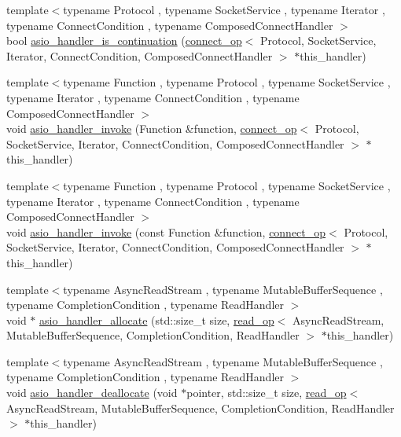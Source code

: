 \begin{DoxyCompactItemize}
\item 
{\footnotesize template$<$typename Protocol , typename Socket\+Service , typename Iterator , typename Connect\+Condition , typename Composed\+Connect\+Handler $>$ }\\bool \hyperlink{namespaceasio_1_1detail_aee7a6a910efdc4298668ed85823e585f}{asio\+\_\+handler\+\_\+is\+\_\+continuation} (\hyperlink{classasio_1_1detail_1_1connect__op}{connect\+\_\+op}$<$ Protocol, Socket\+Service, Iterator, Connect\+Condition, Composed\+Connect\+Handler $>$ $\ast$this\+\_\+handler)
\item 
{\footnotesize template$<$typename Function , typename Protocol , typename Socket\+Service , typename Iterator , typename Connect\+Condition , typename Composed\+Connect\+Handler $>$ }\\void \hyperlink{namespaceasio_1_1detail_a72d0a84b51adc466095a51a973f08fc8}{asio\+\_\+handler\+\_\+invoke} (Function \&function, \hyperlink{classasio_1_1detail_1_1connect__op}{connect\+\_\+op}$<$ Protocol, Socket\+Service, Iterator, Connect\+Condition, Composed\+Connect\+Handler $>$ $\ast$this\+\_\+handler)
\item 
{\footnotesize template$<$typename Function , typename Protocol , typename Socket\+Service , typename Iterator , typename Connect\+Condition , typename Composed\+Connect\+Handler $>$ }\\void \hyperlink{namespaceasio_1_1detail_a8b6277ab4da1389691602d086ff7b78c}{asio\+\_\+handler\+\_\+invoke} (const Function \&function, \hyperlink{classasio_1_1detail_1_1connect__op}{connect\+\_\+op}$<$ Protocol, Socket\+Service, Iterator, Connect\+Condition, Composed\+Connect\+Handler $>$ $\ast$this\+\_\+handler)
\item 
{\footnotesize template$<$typename Async\+Read\+Stream , typename Mutable\+Buffer\+Sequence , typename Completion\+Condition , typename Read\+Handler $>$ }\\void $\ast$ \hyperlink{namespaceasio_1_1detail_a3e0f238f3680cc2cbec076acffd9d6b2}{asio\+\_\+handler\+\_\+allocate} (std\+::size\+\_\+t size, \hyperlink{classasio_1_1detail_1_1read__op}{read\+\_\+op}$<$ Async\+Read\+Stream, Mutable\+Buffer\+Sequence, Completion\+Condition, Read\+Handler $>$ $\ast$this\+\_\+handler)
\item 
{\footnotesize template$<$typename Async\+Read\+Stream , typename Mutable\+Buffer\+Sequence , typename Completion\+Condition , typename Read\+Handler $>$ }\\void \hyperlink{namespaceasio_1_1detail_aed8417586d6b0353efcb0722a1cf2534}{asio\+\_\+handler\+\_\+deallocate} (void $\ast$pointer, std\+::size\+\_\+t size, \hyperlink{classasio_1_1detail_1_1read__op}{read\+\_\+op}$<$ Async\+Read\+Stream, Mutable\+Buffer\+Sequence, Completion\+Condition, Read\+Handler $>$ $\ast$this\+\_\+handler)

\end{DoxyCompactItemize}
